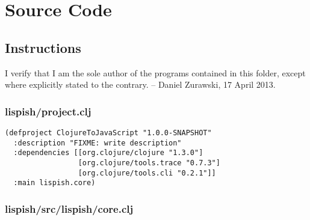 \chapter{Source Code}
\section{Instructions}

I verify that I am the sole author of the programs contained in this folder, except where explicitly stated to the contrary.
-- Daniel Zurawski, 17 April 2013.

\subsection{lispish/project.clj}

\begin{verbatim}
(defproject ClojureToJavaScript "1.0.0-SNAPSHOT"
  :description "FIXME: write description"
  :dependencies [[org.clojure/clojure "1.3.0"]
                 [org.clojure/tools.trace "0.7.3"]
                 [org.clojure/tools.cli "0.2.1"]]
  :main lispish.core)
\end{verbatim}


\subsection{lispish/src/lispish/core.clj}


